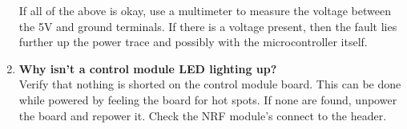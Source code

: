\begin{enumerate}
If all of the above is okay, use a multimeter to measure the voltage between
the 5V and ground terminals. If there is a voltage present, then the fault
lies further up the power trace and possibly with the microcontroller itself.

\item \textbf{Why isn't a control module LED lighting up?} \\
Verify that nothing is shorted on the control module board. This can be done
while powered by feeling the board for hot spots. If none are found, unpower
the board and repower it. Check the NRF module's connect to the header.

\end{enumerate}
